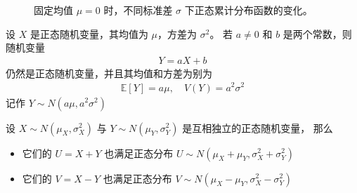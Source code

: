\documentclass[letterpaper,10pt,english]{sphinxmanual}
\begin{document}
\begin{figure}[htbp]
\centering
\capstart

\noindent{}
\caption{固定均值 \(\mu=0\) 时，不同标准差 \(\sigma\) 下正态累计分布函数的变化。}\label{\detokenize{_u6982_u7387_u57fa_u7840/content:id28}}\label{\detokenize{_u6982_u7387_u57fa_u7840/content:fg-probability-007}}\end{figure}

\begin{sphinxShadowBox}

设 \(X\) 是正态随机变量，其均值为 \(\mu\)，方差为 \(\sigma^2\)。
若 \(a \ne 0\) 和 \(b\) 是两个常数，则随机变量
\begin{equation}\label{equation:概率基础/content:概率基础/content:69}
\begin{split}Y = a X +b\end{split}
\end{equation}
仍然是正态随机变量，并且其均值和方差为别为
\begin{equation}\label{equation:概率基础/content:概率基础/content:70}
\begin{split}\mathbb{E}[Y] = a \mu, \quad V(Y) = a^2 \sigma^2\end{split}
\end{equation}
记作 \(Y \sim N(a \mu,a^2 \sigma^2)\)
\end{sphinxShadowBox}

\begin{sphinxShadowBox}

设 \(X \sim  N(\mu_X,\sigma^2_X)\) 与 \(Y \sim  N(\mu_Y,\sigma^2_Y)\) 是互相独立的正态随机变量，
那么
\begin{itemize}
\item {} 
它们的  \(U=X+Y\) 也满足正态分布 \(U \sim N(\mu_X + \mu_Y,\sigma^2_X+\sigma^2_Y)\)

\item {} 
它们的  \(V=X-Y\) 也满足正态分布 \(V \sim N(\mu_X - \mu_Y,\sigma^2_X-\sigma^2_Y)\)

\end{itemize}
\end{sphinxShadowBox}

\end{document}
